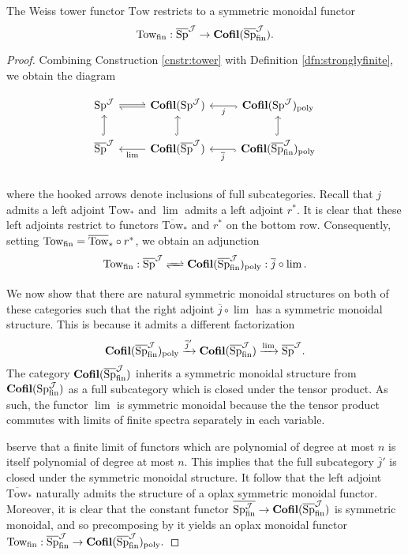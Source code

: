 \begin{prop}\label{prop:weissmonoidal}
The Weiss tower functor $\text{Tow}$ restricts to a symmetric monoidal functor $$\text{Tow}_{\text{fin}}: \overline{\operatorname{\text{Sp}}}^{\operatorname{\mathcal{J}}} \to \operatorname{\textbf{Cofil}}(\overline{\operatorname{\text{Sp}}}^{\operatorname{\mathcal{J}}}_{\operatorname{\text{fin}}}).$$
\end{prop}
\begin{proof}
Combining Construction \ref{cnstr:tower} with Definition \ref{dfn:stronglyfinite}, we obtain the diagram

$$
\begin{tikzcd}
\Sp^{\J} \rar[harpoon, yshift=1pt] &\lar[harpoon, yshift=-1pt] \Cofil(\Sp^{\J})&\Cofil(\Sp^{\J})_{\text{poly}} \arrow[l,hook, "j"]  \\
 \overline{\Sp}^{\J} \arrow[u, hook] &\Cofil(\overline{\Sp}^{\J}) \arrow[l, "\lim"] \arrow[u,hook] &  \Cofil(\overline{\Sp}^{\J}_{\fin})_{\text{poly}} \arrow[l,hook, "\overline{j}"]  \arrow[u,hook]\\
 \end{tikzcd}%
$$
where the hooked arrows denote inclusions of full subcategories.  Recall that $j$ admits a left adjoint $\text{Tow}_*$ and $\lim$ admits a left adjoint $r^*$.  It is clear that these left adjoints restrict to functors $\overline{\text{Tow}}_*$ and $r^*$ on the bottom row.  Consequently, setting $\text{Tow}_{\operatorname{\text{fin}}} = \overline{\text{Tow}}_* \circ r^*$, we obtain an adjunction $$\text{Tow}_{\fin}: \overline{\Sp}^{\J} \xrightleftharpoons{\quad} \Cofil(\overline{\Sp}^{\J}_{\fin})_{\text{poly}}: \overline{j}\circ \lim.$$ %

We now show that there are natural symmetric monoidal structures on both of these categories such that the right adjoint $\overline{j}\circ \lim$ has a symmetric monoidal structure.  This is because it admits a different factorization $$\operatorname{\textbf{Cofil}}(\overline{\operatorname{\text{Sp}}}^{\operatorname{\mathcal{J}}}_{\operatorname{\text{fin}}})_{\text{poly}} \xrightarrow{\overline{j}'} \operatorname{\textbf{Cofil}}(\overline{\operatorname{\text{Sp}}}^{\operatorname{\mathcal{J}}}_{\operatorname{\text{fin}}}) \xrightarrow{\lim} \overline{\operatorname{\text{Sp}}}^{\operatorname{\mathcal{J}}}.$$ The category $\operatorname{\textbf{Cofil}}(\overline{\operatorname{\text{Sp}}}^{\operatorname{\mathcal{J}}}_{\operatorname{\text{fin}}})$ inherits a symmetric monoidal structure from $\operatorname{\textbf{Cofil}}(\operatorname{\text{Sp}}^{\operatorname{\mathcal{J}}}_{\operatorname{\text{fin}}})$ as a full subcategory which is closed under the tensor product.  As such, the functor $\lim$ is symmetric monoidal because the the tensor product commutes with limits of finite spectra separately in each variable.  %


bserve that a finite limit of functors which are polynomial of degree at most $n$ is itself polynomial of degree at most $n$.  This implies that the full subcategory $\overline{j}'$ is closed under the symmetric monoidal structure.  It follow that the left adjoint $\overline{\text{Tow}}_*$ naturally admits the structure of a oplax symmetric monoidal functor.  Moreover, it is clear that the constant functor $\overline{\operatorname{\text{Sp}}^{\operatorname{\mathcal{J}}}_{\operatorname{\text{fin}}}}\to  \operatorname{\textbf{Cofil}}(\overline{\operatorname{\text{Sp}}}^{\operatorname{\mathcal{J}}}_{\operatorname{\text{fin}}})$ is symmetric monoidal, and so precomposing by it yields an oplax monoidal functor $\text{Tow}_{\operatorname{\text{fin}}} :\overline{\operatorname{\text{Sp}}}^{\operatorname{\mathcal{J}}}_{\operatorname{\text{fin}}} \to \operatorname{\textbf{Cofil}}(\overline{\operatorname{\text{Sp}}}^{\operatorname{\mathcal{J}}}_{\operatorname{\text{fin}}})_{\text{poly}}.$


\end{proof}
